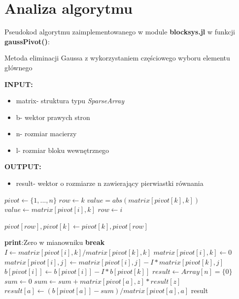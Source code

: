 \documentclass[a4paper,14pt]{report}
\begin{document}
  \section{Analiza algorytmu}
  Pseudokod algorytmu zaimplementowanego w module \textbf{blocksys.jl} w funkcji \textbf{gaussPivot()}:
  \begin{algorithm}[H]
    \caption{Metoda eliminacji Gaussa z wykorzystaniem częściowego wyboru elementu głównego}
    \textbf{INPUT:}
    \begin{itemize}
      \item matrix- struktura typu \textit{SparseArray}
      \item b- wektor prawych stron 
      \item n- rozmiar macierzy
      \item l- rozmiar bloku wewnętrznego
    \end{itemize}
    \textbf{OUTPUT:}
    \begin{itemize}
      \item result- wektor o rozmiarze n zawierający pierwiastki równania
    \end{itemize}
    \begin{algorithmic} 
      \STATE $pivot \leftarrow \{1,...,n\}$
        \STATE $row \leftarrow k$
        \STATE $value=abs(matrix[pivot[k],k])$
            \STATE $value \leftarrow matrix[pivot[i],k]$
            \STATE $row \leftarrow i$
          \ENDIF
        \ENDFOR

        \STATE $pivot[row],pivot[k] \leftarrow pivot[k],pivot[row]$



            \STATE \textbf{print}:Zero w mianowniku
            \STATE \textbf{break}
          \ENDIF
          \STATE $I \leftarrow matrix[pivot[i],k]/matrix[pivot[k],k]$
          \STATE $matrix[pivot[i],k] \leftarrow 0$
            \STATE $matrix[pivot[i],j] \leftarrow matrix[pivot[i],j]-I*matrix[pivot[k],j]$
          \ENDFOR
          \STATE $b[pivot[i]] \leftarrow b[pivot[i]]-I*b[pivot[k]]$
        \ENDFOR
        \STATE $result \leftarrow Array[n]=\{0\}$
          \STATE $sum \leftarrow 0$
            \STATE $sum \leftarrow sum+matrix[pivot[a],z]*result[z]$
          \ENDFOR
          \STATE $result[a] \leftarrow (b[pivot[a]]-sum)/matrix[pivot[a],a]$
        \ENDFOR
      \ENDFOR
      \RETURN result
      \end{algorithmic}
  \end{algorithm}
\end{document}
